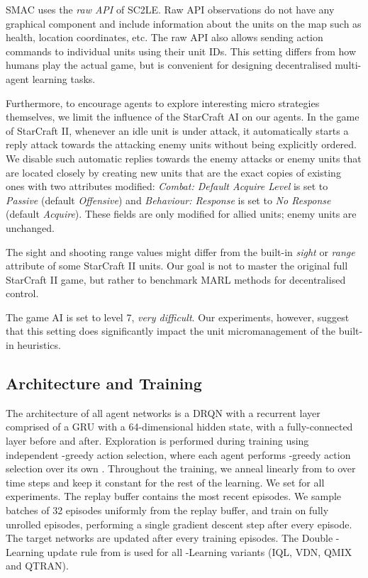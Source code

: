 \documentclass[twoside,11pt]{article}
\begin{document}
SMAC uses the \textit{raw API} of SC2LE. Raw API observations do not have any graphical component and include information about the units on the map such as health, location coordinates, etc. The raw API also allows sending action commands to individual units using their unit IDs. This setting differs from how humans play the actual game, but is convenient for designing decentralised multi-agent learning tasks. 


Furthermore, to encourage agents to explore interesting micro strategies themselves, we limit the influence of the StarCraft AI on our agents. 
In the game of StarCraft II, whenever an idle unit is under attack, it automatically starts a reply attack towards the attacking enemy units without being explicitly ordered. We disable such automatic replies towards the enemy attacks or enemy units that are located closely by creating new units that are the exact copies of existing ones with two attributes modified: \textit{Combat: Default Acquire Level} is set to \textit{Passive} (default \textit{Offensive}) and \textit{Behaviour: Response} is set to \textit{No Response} (default \textit{Acquire}). These fields are only modified for allied units; enemy units are unchanged.

The sight and shooting range values might differ from the built-in \textit{sight} or \textit{range} attribute of some StarCraft II units. Our goal is not to master the original full StarCraft II game, but rather to benchmark MARL methods for decentralised control.

The game AI is set to level 7, \textit{very difficult}. Our experiments, however, suggest that this setting does significantly impact the unit micromanagement of the built-in heuristics.

\subsection{Architecture and Training}
\label{sec:smac_setup}

The architecture of all agent networks is a DRQN with a recurrent layer 
comprised of a GRU with a 64-dimensional hidden state, with a fully-connected 
layer before and after.
Exploration is performed during training using independent -greedy action selection, where each agent  performs -greedy action selection over its own . 
Throughout the training, we anneal  linearly from  to  over  time steps and keep it constant for the rest of the learning. 
We set  for all experiments.
The replay buffer contains the most recent  episodes.  
We sample batches of 32 episodes uniformly from the replay buffer, and train on fully unrolled episodes, performing a single gradient descent step after every episode.
The target networks are updated after every  training episodes.
The Double -Learning update rule from \citep{van2016deep} is used for all -Learning variants (IQL, VDN, QMIX and QTRAN).
\end{document}
